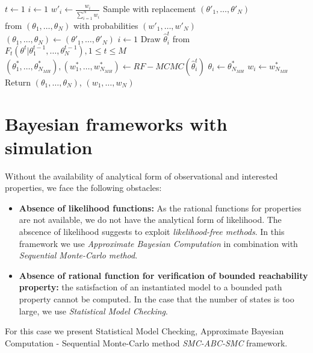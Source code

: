 \begin{algorithm}
      \begin{algorithmic}[H]
            \State $t \leftarrow 1$
            \State $i \leftarrow 1$ 
            \State $w'_i \leftarrow \frac{w_i}{\sum_{i=1}^N w_i} $
            \EndWhile
            \State Sample with replacement $(\theta'_1,\ldots,\theta'_N)$  \\\hspace{1.5cm} from $(\theta_1,\ldots,\theta_N)$ with probabilities $(w'_1,\ldots,w'_N)$
            \State $(\theta_1,\ldots,\theta_N) \leftarrow (\theta'_1,\ldots,\theta'_N)$
            \State $i \leftarrow 1$
             
            \State Draw $\hat{\theta}^t_i$ from $F_t(\theta^t | \theta^{t-1}_1,\ldots,\theta^{t-1}_N), 1\leq t \leq M$
            \State $(\theta^*_1,\ldots,\theta^*_{N_{MH}}), (w^*_1,\ldots,w^*_{N_{MH}}) \leftarrow RF-MCMC(\hat{\theta}^t_i)$
            \State $\theta_i \leftarrow \theta^*_{N_{MH}}$
            \State $w_i \leftarrow w^*_{N_{MH}}$
            \EndWhile
            \EndWhile
            \State Return $(\theta_1,\ldots,\theta_{N})$, $(w_1,\ldots,w_{N})$
            \EndProcedure
      \end{algorithmic}
\end{algorithm}

\section{Bayesian frameworks with simulation}

Without the availability of analytical form of observational and interested properties, we face the
following obstacles:
\begin{itemize}
      \item \textbf{Absence of likelihood functions:} As the rational functions for properties are
            not available, we do not have the analytical form of likelihood. The abscence of
            likelihood suggests to exploit \textit{likelihood-free methods}. In this framework we
            use \textit{Approximate Bayesian Computation} in combination with \textit{Sequential
                  Monte-Carlo method}.
      \item \textbf{Absence of rational function for verification of bounded reachability property:}
            the satisfaction of an instantiated model to a bounded path property cannot be computed.
            In the case that the number of states is too large, we use \textit{Statistical Model
                  Checking}.
\end{itemize}
For this case we present Statistical Model Checking, Approximate Bayesian Computation - Sequential
Monte-Carlo method \textit{SMC-ABC-SMC} framework.

